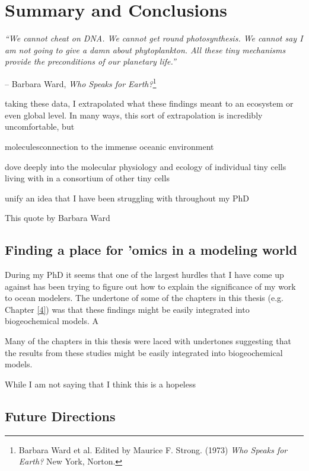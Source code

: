 

\chapter{Summary and Conclusions}
\label{chap:6}

\raggedbottom

\textit{``We cannot cheat on DNA. We cannot get round photosynthesis. We cannot say I am not going to give a damn about phytoplankton. All these tiny mechanisms provide the preconditions of our planetary life.'' }

\begin{flushright}-- Barbara Ward, \textit{Who Speaks for Earth?}\footnote{Barbara Ward et al. Edited by Maurice F. Strong. (1973) \textit{Who Speaks for Earth?} New York, Norton. }\end{flushright}



taking these data, I extrapolated what these findings meant to an ecosystem or even global level. In many ways, this sort of extrapolation is incredibly uncomfortable, but 

moleculesconnection to the immense oceanic environment

dove deeply into the molecular physiology and ecology of individual tiny cells living with in a consortium of other tiny cells  

unify an idea that I have been struggling with throughout my PhD

This quote by Barbara Ward

\section{Finding a place for 'omics in a modeling world}

During my PhD it seems that one of the largest hurdles that I have come up against has been trying to figure out how to explain the significance of my work to ocean modelers. The undertone of some of the chapters in this thesis (e.g. Chapter \ref{4}) was that these findings might be easily integrated into biogeochemical models. A

Many of the chapters in this thesis were laced with undertones suggesting that the results from these studies might be easily integrated into biogeochemical models. 

While I am not saying that I think this is a hopeless 

\section{Future Directions}

